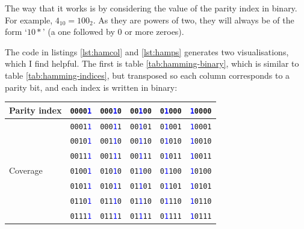 \documentclass{article}
\begin{document}
    The way that it works is by considering the value of the parity index in
    binary. For example, $4_{10}=100_{2}$. As they are powers of two, they will
    always be of the form `$10*$' (a one followed by 0 or more zeroes).

    The code in listings \ref{lst:hamcol} and \ref{lst:hamps} generates two
    visualisations, which I find helpful. The first is table
    \ref{tab:hamming-binary}, which is similar to table
    \ref{tab:hamming-indices}, but transposed so each column corresponds to a
    parity bit, and each index is written in binary:

\begin{table}[h]
\begin{center}
    \begin{tabular}{l|rrrrr}
    \toprule
    Parity index & \texttt{0000\textcolor{blue}{1}} & \texttt{000\textcolor{blue}{1}0} & \texttt{00\textcolor{blue}{1}00} & \texttt{0\textcolor{blue}{1}000} & \texttt{\textcolor{blue}{1}0000} \\
    \midrule
    \multirow{14}{*}{Coverage} & \texttt{0001\textcolor{blue}{1}} & \texttt{000\textcolor{blue}{1}1} & \texttt{00\textcolor{blue}{1}01} & \texttt{0\textcolor{blue}{1}001} & \texttt{\textcolor{blue}{1}0001} \\
    & \texttt{0010\textcolor{blue}{1}} & \texttt{001\textcolor{blue}{1}0} & \texttt{00\textcolor{blue}{1}10} & \texttt{0\textcolor{blue}{1}010} & \texttt{\textcolor{blue}{1}0010} \\
    & \texttt{0011\textcolor{blue}{1}} & \texttt{001\textcolor{blue}{1}1} & \texttt{00\textcolor{blue}{1}11} & \texttt{0\textcolor{blue}{1}011} & \texttt{\textcolor{blue}{1}0011} \\
    & \texttt{0100\textcolor{blue}{1}} & \texttt{010\textcolor{blue}{1}0} & \texttt{01\textcolor{blue}{1}00} & \texttt{0\textcolor{blue}{1}100} & \texttt{\textcolor{blue}{1}0100} \\
    & \texttt{0101\textcolor{blue}{1}} & \texttt{010\textcolor{blue}{1}1} & \texttt{01\textcolor{blue}{1}01} & \texttt{0\textcolor{blue}{1}101} & \texttt{\textcolor{blue}{1}0101} \\
    & \texttt{0110\textcolor{blue}{1}} & \texttt{011\textcolor{blue}{1}0} & \texttt{01\textcolor{blue}{1}10} & \texttt{0\textcolor{blue}{1}110} & \texttt{\textcolor{blue}{1}0110} \\
    & \texttt{0111\textcolor{blue}{1}} & \texttt{011\textcolor{blue}{1}1} & \texttt{01\textcolor{blue}{1}11} & \texttt{0\textcolor{blue}{1}111} & \texttt{\textcolor{blue}{1}0111} \\

\end{tabular}
\end{center}
\end{table}
\end{document}
